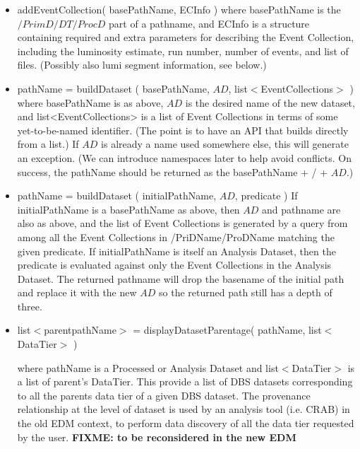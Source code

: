 \documentclass[pdftex]{cmspaper}
\begin{document}
\begin{itemize}
\item addEventCollection( basePathName, ECInfo ) 
       where basePathName is the $/PrimD/DT/ProcD$ part of a pathname, and 
       ECInfo is a structure containing required and extra parameters for 
       describing the Event Collection, including the luminosity estimate, 
       run number, number of events, and list of files.  (Possibly also lumi 
       segment information, see below.) 

\item pathName = buildDataset ( basePathName, $AD$, list$<$EventCollections$>$ )
       where basePathName is as above, $AD$ is the desired name of the new
       dataset,  and list<EventCollections> is a list of Event Collections in 
       terms of some yet-to-be-named identifier.  (The point is to have an API 
       that builds directly from a list.)  If $AD$ is already a name used 
       somewhere else, this will generate an exception.   (We can introduce 
       namespaces later to help avoid conflicts.  On success, the pathName 
       should be returned as the basePathName + / + $AD$.) 

\item  pathName = buildDataset ( initialPathName, $AD$, predicate )
       If initialPathName is a basePathName as above, then $AD$ and pathname 
       are also as above, and the list of Event Collections is generated by a
       query from among all the Event Collections in /PriDName/ProDName 
       matching the given predicate.  If initialPathName is itself an Analysis 
       Dataset, then the predicate is evaluated against only the Event 
       Collections in the Analysis Dataset.  The returned pathname will drop 
       the basename of the initial path and replace it with the new $AD$ so 
       the returned path still has a depth of three.  

\item  list$<$parentpathName$>$  = displayDatasetParentage( pathName, list$<$DataTier$>$ )

       where pathName is a Processed or Analysis Dataset and list$<$DataTier$>$        is a list of parent's DataTier.
       This provide a list of DBS datasets corresponding to all the parents
       data tier of a given DBS dataset. 
       The provenance relationship at the level of dataset is used by
       an analysis tool (i.e. CRAB) in the old EDM context, to perform
       data discovery of all the data tier requested by the user.
       {\bf FIXME: to be reconsidered in the new EDM}


\end{itemize}
\end{document}
